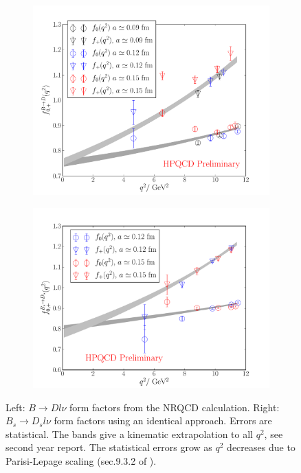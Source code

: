 \begin{figure}
\centering
\begin{subfigure}{.55\textwidth}
  \centering
  \includegraphics[width=1.0\linewidth]{images/NRQCD/BD_apr18.pdf}
  \label{fig:sub1}
\end{subfigure}%
\begin{subfigure}{.55\textwidth}
  \centering
  \includegraphics[width=1.0\linewidth]{images/NRQCD/BsDs_apr18.pdf}
  \label{fig:sub2}
\end{subfigure}
\caption{Left: $B\to D l\nu$ form factors from the NRQCD calculation. Right: $B_s\to D_s l\nu$ form factors using an identical approach. Errors are statistical. The bands give a kinematic extrapolation to all $q^2$, see second year report. The statistical errors grow as $q^2$ decreases due to Parisi-Lepage scaling (sec.9.3.2 of \cite{DeGrand:2006zz}).}
\label{fig:nrqcd}
\end{figure}

